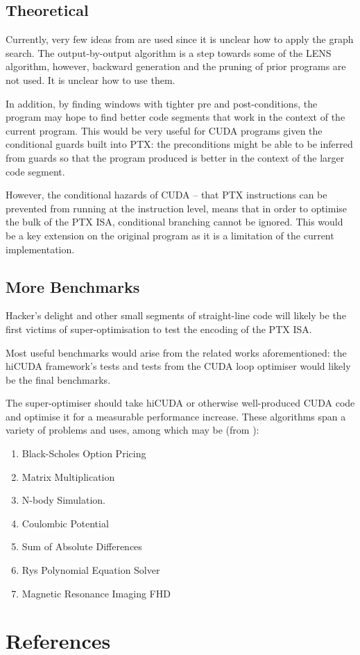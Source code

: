 \documentclass[letterpaper,twocolumn,10pt]{article}
\begin{document}
\subsection{Theoretical}

Currently, very few ideas from \cite{superopt} are used since it is
unclear how to apply the graph search. The output-by-output algorithm is
a step towards some of the LENS algorithm, however, backward generation
and the pruning of prior programs are not used. It is unclear how to use
them.

In addition, by finding windows with tighter pre and post-conditions,
the program may hope to find better code segments
that work in the context of the current program.
This would be very useful for CUDA programs given
the conditional guards built into PTX: the preconditions
might be able to be inferred from guards so that
the program produced is better in the context
of the larger code segment.

However, the conditional hazards of CUDA -- that
PTX instructions can be prevented from running
at the instruction level, means that in order to
optimise the bulk of the PTX ISA, conditional
branching cannot be ignored. This would be
a key extension on the original program as
it is a limitation of the current implementation.

\subsection{More Benchmarks}

Hacker's delight and other small segments of
straight-line code will likely be the first
victims of super-optimisation to test the
encoding of the PTX ISA.

Most useful benchmarks would arise from the related works aforementioned:
the hiCUDA \cite{hicuda} framework's tests and tests
from the CUDA loop optimiser \cite{CUDASynth} would likely
be the final benchmarks.

The super-optimiser should take hiCUDA or otherwise
well-produced CUDA code and optimise it for
a measurable performance increase.
These algorithms span a variety of problems and uses,
among which may be (from \cite{hicuda}):
\begin{enumerate}
    \item Black-Scholes Option Pricing
    \item Matrix Multiplication
    \item N-body Simulation.
    \item Coulombic Potential
    \item Sum of Absolute Differences
    \item Rys Polynomial Equation Solver
    \item Magnetic Resonance Imaging FHD
\end{enumerate}

\section{References}


\end{document}
